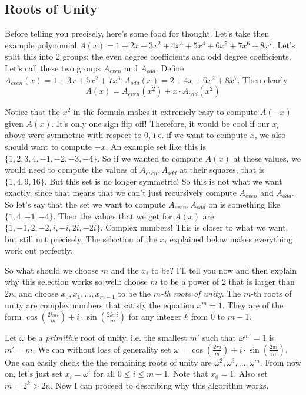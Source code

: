 \subsection{Roots of Unity}

Before telling you precisely, here's some food for thought. Let's take then example polynomial $A(x) = 1+2x+3x^2+4x^3+5x^4+6x^5+7x^6+8x^7.$ Let's split this into 2 groups: the even degree coefficients and odd degree coefficients. Let's call these two groups $A_{even}$ and $A_{odd}.$ Define $A_{even}(x) = 1+3x+5x^2+7x^3, A_{odd}(x) = 2+4x+6x^2+8x^7.$ Then clearly \[ A(x) = A_{even}(x^2) + x \cdot A_{odd}(x^2) \]

Notice that the $x^2$ in the formula makes it extremely easy to compute $A(-x)$ given $A(x).$ It's only one sign flip off! Therefore, it would be cool if our $x_i$ above were symmetric with respect to 0, i.e. if we want to compute $x$, we also should want to compute $-x$. An example set like this is $\{1, 2, 3, 4, -1, -2, -3, -4 \}.$ So if we wanted to compute $A(x)$ at these values, we would need to compute the values of $A_{even}, A_{odd}$ at their squares, that is $\{1, 4, 9, 16 \}.$ But this set is no longer symmetric! So this is not what we want exactly, since that means that we can't just recursively compute $A_{even}$ and $A_{odd}.$ So let's say that the set we want to compute $A_{even}, A_{odd}$ on is something like $\{1, 4, -1, -4 \}.$ Then the values that we get for $A(x)$ are $\{1, -1, 2, -2, i, -i, 2i, -2i \}.$ Complex numbers! This is closer to what we want, but still not precisely. The selection of the $x_i$ explained below makes everything work out perfectly.

So what should we choose $m$ and the $x_i$ to be? I'll tell you now and then explain why this selection works so well: choose $m$ to be a power of $2$ that is larger than $2n$, and choose $x_0, x_1, \dots, x_{m-1}$ to be the $m$\emph{-th roots of unity}. The $m$-th roots of unity are complex numbers that satisfy the equation $x^m = 1.$ They are of the form $\cos\left(\frac{2k\pi i}{m}\right) + i \cdot \sin\left(\frac{2k\pi i}{m} \right)$ for any integer $k$ from $0$ to $m-1.$

Let $\omega$ be a \emph{primitive} root of unity, i.e. the smallest $m'$ such that $\omega^{m'} = 1$ is $m' = m.$ We can without loss of generality set $\omega = \cos\left(\frac{2\pi i}{m}\right) + i \cdot \sin\left(\frac{2\pi i}{m} \right).$ One can easily check the the remaining roots of unity are $\omega^2, \omega^3, \dots, \omega^m.$ From now on, let's just set $x_i = \omega^i$ for all $0 \le i \le m-1.$ Note that $x_0 = 1.$ Also set $m = 2^k > 2n.$ Now I can proceed to describing why this algorithm works.

